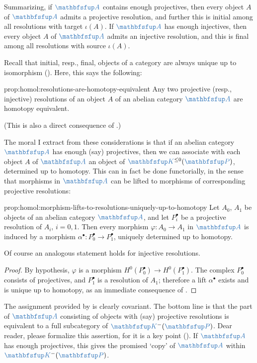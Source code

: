 Summarizing, if $\categ{A}$ contains enough projectives, then every
object $A$ of $\categ{A}$ admits a projective resolution, and further
this is initial among all resolutions with target $\iota(A)$.  If
$\categ{A}$ has enough injectives, then every object $A$ of
$\categ{A}$ admits an injective resolution, and this is final among
all resolutions with source $\iota(A)$.

Recall that initial, resp., final, objects of a category are always
unique up to isomorphism
(). Here, this says the
following:

\begin{prop}{}{prop:homol:resolutions-are-homotopy-equivalent}
  Any two projective (resp., injective) resolutions of an object $A$
  of an abelian category $\categ{A}$ are homotopy equivalent.
\end{prop}

(This is also a direct consequence of .)

The moral I extract from these considerations is that if an abelian
category $\categ{A}$ has enough (say) projectives, then we can
associate with each object $A$ of $\categ{A}$ an object of
$\categ{K}^{\le 0}(\categ{P})$, determined up to homotopy. This can in
fact be done functorially, in the sense that morphisms in $\categ{A}$
can be lifted to morphisms of corresponding projective resolutions:

\begin{prop}{}{prop:homol:morphism-lifts-to-resolutions-uniquely-up-to-homotopy}
  Let $A_0$, $A_1$ be objects of an abelian category $\categ{A}$, and
  let $P_i^\bullet$ be a projective resolution of $A_i$, $i = 0,
  1$. Then every morphism $\varphi : A_0 \to A_1$ in $\categ{A}$ is
  induced by a morphism
  $\alpha^\bullet : P_0^\bullet \to P_1^\bullet$, uniquely determined
  up to homotopy.

  Of course an analogous statement holds for injective resolutions.
\end{prop}
\begin{proof}
  By hypothesis, $\varphi$ is a morphism
  $H^0(P_0^\bullet) \to H^0(P_1^\bullet)$. The complex $P_0^\bullet$
  consists of projectives, and $P_1^\bullet$ is a resolution of $A_1$;
  therefore a lift $\alpha^\bullet$ exists and is unique up to
  homotopy, as an immediate consequence of .
\end{proof}

The assignment provided by  is clearly
covariant. The bottom line is that the part of $\categ{A}$ consisting
of objects with (say) projective resolutions is equivalent to a full
subcategory of $\categ{K}^-(\categ{P})$. Dear reader, please formalize
this assertion, for it is a key point
(). If
$\categ{A}$ has enough projectives, this gives the promised `copy' of
$\categ{A}$ within $\categ{K}^-(\categ{P})$.

